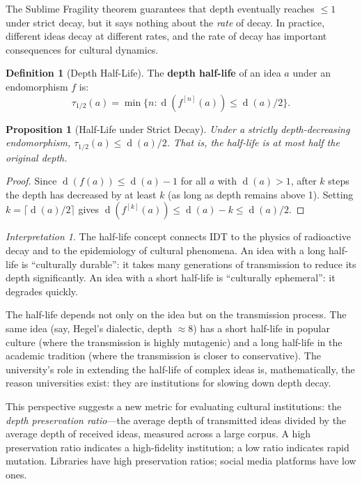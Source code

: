 \documentclass[11pt,openany]{book}
\theoremstyle{definition}
\newtheorem{definition}[axiom]{Definition}
\theoremstyle{plain}
\newtheorem{proposition}[axiom]{Proposition}
\theoremstyle{remark}
\newtheorem{interpretation}[axiom]{Interpretation}
\newcommand{\depth}{\operatorname{d}}       %
\begin{document}
The Sublime Fragility theorem guarantees that depth eventually reaches $\leq 1$ under strict decay, but it says nothing about the \emph{rate} of decay. In practice, different ideas decay at different rates, and the rate of decay has important consequences for cultural dynamics.

\begin{definition}[Depth Half-Life]
The \textbf{depth half-life} of an idea $a$ under an endomorphism $f$ is:
\[
\tau_{1/2}(a) = \min \{ n : \depth(f^{[n]}(a)) \leq \depth(a)/2 \}.
\]
\end{definition}

\begin{proposition}[Half-Life under Strict Decay]
Under a strictly depth-decreasing endomorphism, $\tau_{1/2}(a) \leq \depth(a)/2$. That is, the half-life is at most half the original depth.
\end{proposition}

\begin{proof}
Since $\depth(f(a)) \leq \depth(a) - 1$ for all $a$ with $\depth(a) > 1$, after $k$ steps the depth has decreased by at least $k$ (as long as depth remains above 1). Setting $k = \lceil \depth(a)/2 \rceil$ gives $\depth(f^{[k]}(a)) \leq \depth(a) - k \leq \depth(a)/2$.
\end{proof}

\begin{interpretation}
The half-life concept connects IDT to the physics of radioactive decay and to the epidemiology of cultural phenomena. An idea with a long half-life is ``culturally durable'': it takes many generations of transmission to reduce its depth significantly. An idea with a short half-life is ``culturally ephemeral'': it degrades quickly.

The half-life depends not only on the idea but on the transmission process. The same idea (say, Hegel's dialectic, depth $\approx 8$) has a short half-life in popular culture (where the transmission is highly mutagenic) and a long half-life in the academic tradition (where the transmission is closer to conservative). The university's role in extending the half-life of complex ideas is, mathematically, the reason universities exist: they are institutions for slowing down depth decay.

This perspective suggests a new metric for evaluating cultural institutions: the \emph{depth preservation ratio}---the average depth of transmitted ideas divided by the average depth of received ideas, measured across a large corpus. A high preservation ratio indicates a high-fidelity institution; a low ratio indicates rapid mutation. Libraries have high preservation ratios; social media platforms have low ones.
\end{interpretation}
\end{document}
